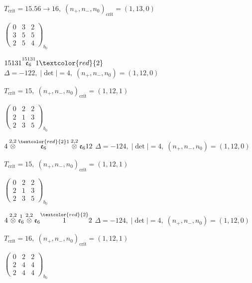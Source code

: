 \documentclass[10pt]{article}
\begin{document}
\hspace{1em}$T_{\text{crit}}=15.56 \to 16,\; (n_+,n_-,n_0)_{\text{crit}}=(1,13,0)$

\hspace{2em}$\left(\begin{smallmatrix}0 & 3 & 2 \\ 3 & 5 & 5 \\ 2 & 5 & 4\end{smallmatrix}\right)_{\!b_0}$

\smallskip

$15131\overset{15131}{\mathfrak{e}_6}1\textcolor{red}{2}$ \quad $\Delta=-122,\; |\det|=4,\; (n_+,n_-,n_0)=(1,12,0)$

\hspace{1em}$T_{\text{crit}}=15,\; (n_+,n_-,n_0)_{\text{crit}}=(1,12,1)$

\hspace{2em}$\left(\begin{smallmatrix}0 & 2 & 2 \\ 2 & 1 & 3 \\ 2 & 3 & 5\end{smallmatrix}\right)_{\!b_0}$

\smallskip

$4\overset{2,2}{\otimes}\overset{\textcolor{red}{2}1}{\mathfrak{e}_6}\overset{2,2}{\otimes}\mathfrak{e}_612$ \quad $\Delta=-124,\; |\det|=4,\; (n_+,n_-,n_0)=(1,12,0)$

\hspace{1em}$T_{\text{crit}}=15,\; (n_+,n_-,n_0)_{\text{crit}}=(1,12,1)$

\hspace{2em}$\left(\begin{smallmatrix}0 & 2 & 2 \\ 2 & 1 & 3 \\ 2 & 3 & 5\end{smallmatrix}\right)_{\!b_0}$

$4\overset{2,2}{\otimes}\overset{1}{\mathfrak{e}_6}\overset{2,2}{\otimes}\mathfrak{e}_6\overset{\textcolor{red}{2}}{1}2$ \quad $\Delta=-124,\; |\det|=4,\; (n_+,n_-,n_0)=(1,12,0)$

\hspace{1em}$T_{\text{crit}}=16,\; (n_+,n_-,n_0)_{\text{crit}}=(1,12,1)$

\hspace{2em}$\left(\begin{smallmatrix}0 & 2 & 2 \\ 2 & 4 & 4 \\ 2 & 4 & 4\end{smallmatrix}\right)_{\!b_0}$
\end{document}
